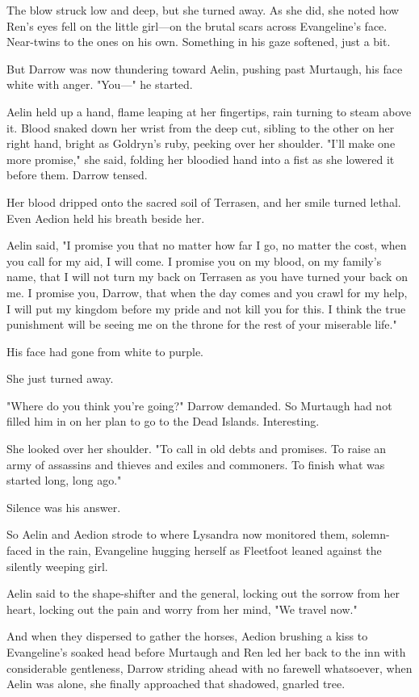 The blow struck low and deep, but she turned away.
As she did, she noted how Ren's eyes fell on the little girl---on the brutal scars across Evangeline's face.
Near-twins to the ones on his own.
Something in his gaze softened, just a bit.

But Darrow was now thundering toward Aelin, pushing past Murtaugh, his face white with anger.
"You---" he started.

Aelin held up a hand, flame leaping at her fingertips, rain turning to steam above it.
Blood snaked down her wrist from the deep cut, sibling to the other on her right hand, bright as Goldryn's ruby, peeking over her shoulder.
"I'll make one more promise," she said, folding her bloodied hand into a fist as she lowered it before them.
Darrow tensed.

Her blood dripped onto the sacred soil of Terrasen, and her smile turned lethal.
Even Aedion held his breath beside her.

Aelin said, "I promise you that no matter how far I go, no matter the cost, when you call for my aid, I will come.
I promise you on my blood, on my family's name, that I will not turn my back on Terrasen as you have turned your back on me.
I promise you, Darrow, that when the day comes and you crawl for my help, I will put my kingdom before my pride and not kill you for this.
I think the true punishment will be seeing me on the throne for the rest of your miserable life."

His face had gone from white to purple.

She just turned away.

"Where do you think you're going?"
Darrow demanded.
So Murtaugh had not filled him in on her plan to go to the Dead Islands.
Interesting.

She looked over her shoulder.
"To call in old debts and promises.
To raise an army of assassins and thieves and exiles and commoners.
To finish what was started long, long ago."

Silence was his answer.

So Aelin and Aedion strode to where Lysandra now monitored them, solemn-faced in the rain, Evangeline hugging herself as Fleetfoot leaned against the silently weeping girl.

Aelin said to the shape-shifter and the general, locking out the sorrow from her heart, locking out the pain and worry from her mind, "We travel now."

And when they dispersed to gather the horses, Aedion brushing a kiss to Evangeline's soaked head before Murtaugh and Ren led her back to the inn with considerable gentleness, Darrow striding ahead with no farewell whatsoever, when Aelin was alone, she finally approached that shadowed, gnarled tree.


